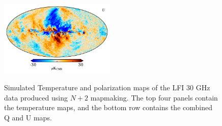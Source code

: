 \documentclass{aa}
\begin{document}
\begin{figure}
  \includegraphics[width=0.49\textwidth]{figs/sim_U.pdf}\\
  \caption{Simulated Temperature and polarization maps of the LFI 30 GHz data produced using $N+2$ mapmaking. The top four panels contain the temperature maps, and the bottom row contains the combined Q and U maps.}
  \label{fig:sim}
\end{figure}
\end{document}
